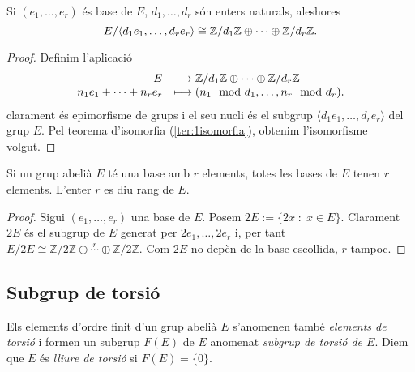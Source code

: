 \documentclass[../main.tex]{subfiles}
\begin{document}
\begin{lema}\label{lema:lemalema}
Si $(e_1,\ldots,e_r)$ és base de $E$, $d_1,\ldots,d_r$ són enters naturals, aleshores
\begin{equation}
    \notag
    E/\langle d_1e_1,\ldots,d_re_r\rangle\cong \mathbb{Z}/d_1\mathbb{Z}\oplus\cdots\oplus\mathbb{Z}/d_r\mathbb{Z}.
\end{equation}
\end{lema}
\begin{proof}
Definim l'aplicació
\begin{equation}
    \notag
    \begin{array}{rl}
        E & \longrightarrow \mathbb{Z}/d_1\mathbb{Z}\oplus\cdots\oplus\mathbb{Z}/d_r\mathbb{Z} \\
        n_1e_1+\cdots+n_re_r & \longmapsto (n_1\mod d_1,\ldots,n_r\mod d_r).
    \end{array}
\end{equation}
clarament és epimorfisme de grups i el seu nucli és el subgrup $\langle d_1e_1,\ldots,d_re_r\rangle$ del grup $E$. Pel teorema d'isomorfia (\ref{ter:1isomorfia}), obtenim l'isomorfisme volgut.
\end{proof}

\begin{prop}
Si un grup abelià $E$ té una base amb $r$ elements, totes les bases de $E$ tenen $r$ elements. L'enter $r$ es diu rang de $E$.
\end{prop}
\begin{proof}
Sigui $(e_1,\ldots,e_r)$ una base de $E$. Posem $2E:=\{2x\;:\;x\in E\}$. Clarament $2E$ és el subgrup de $E$ generat per $2e_1,\ldots,2e_r$ i, per tant $E/2E\cong \mathbb{Z}/2\mathbb{Z}\oplus\overset{r}{\cdots}\oplus\mathbb{Z}/2\mathbb{Z}$. Com $2E$ no depèn de la base escollida, $r$ tampoc.
\end{proof}








\subsection{Subgrup de torsió}
\begin{defi}
Els elements d'ordre finit d'un grup abelià $E$ s'anomenen també \textit{elements de torsió} i formen un subgrup $F(E)$ de $E$ anomenat \textit{subgrup de torsió de $E$}. Diem que $E$ és \textit{lliure de torsió} si $F(E) = \{0\}$.
\end{defi}
\end{document}
